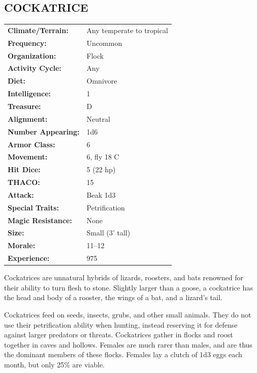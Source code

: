 \begin{multicols}{2}
\noindent
\begin{minipage}{\columnwidth}

\vspace{1em}

\subsection{COCKATRICE}

\noindent
\begin{tabular}{p{}p{}}
\textbf{Climate/Terrain:}	& Any temperate to tropical \\
\textbf{Frequency:} 		& Uncommon \\
\textbf{Organization:} 		& Flock \\
\textbf{Activity Cycle:} 	& Any \\
\textbf{Diet:} 				& Omnivore \\
\textbf{Intelligence:} 		& 1 \\
\textbf{Treasure:} 			& D \\
\textbf{Alignment:} 		& Neutral \\
\hline
\textbf{Number Appearing:} 	& 1d6 \\
\textbf{Armor Class:} 		& 6 \\
\textbf{Movement:} 			& 6, fly 18 C \\
\textbf{Hit Dice:} 			& 5 (22 hp) \\
\textbf{THACO:} 			& 15 \\
\textbf{Attack:} 			& Beak 1d3 \\
\textbf{Special Traits:} & Petrification \\
\textbf{Magic Resistance:} 	& None \\
\textbf{Size:} 				& Small (3' tall) \\
\textbf{Morale:} 			& 11--12 \\
\textbf{Experience:} 		& 975 \\ %
\end{tabular}

\end{minipage}

Cockatrices are unnatural hybrids of lizards, roosters, and bats renowned for their ability to turn flesh to stone. Slightly larger than a goose, a cockatrice has the head and body of a rooster, the wings of a bat, and a lizard's tail. 

Cockatrices feed on seeds, insects, grubs, and other small animals. They do not use their petrification ability when hunting, instead reserving it for defense against larger predators or threats. Cockatrices gather in flocks and roost together in caves and hollows. Females are much rarer than males, and are thus the dominant members of these flocks. Females lay a clutch of 1d3 eggs each month, but only 25\% are viable.


\end{multicols}
